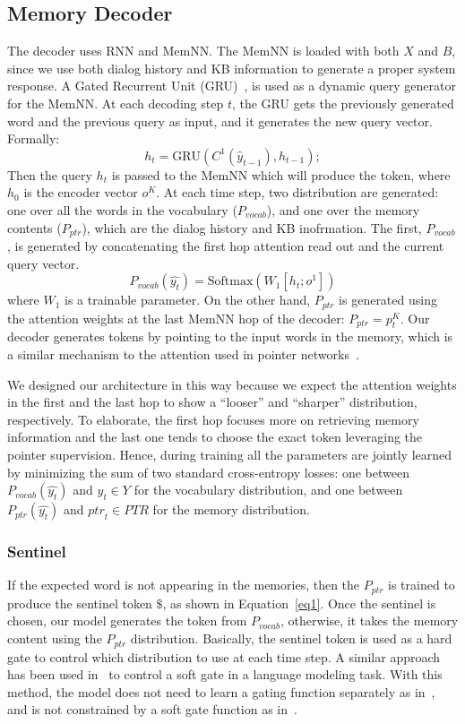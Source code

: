 \documentclass[11pt,a4paper]{article}
\begin{document}
\subsection{Memory Decoder}
The decoder uses RNN and MemNN. The MemNN is loaded with both $X$ and $B$, since we use both dialog history and KB information to generate a proper system response. A Gated Recurrent Unit (GRU)~\cite{GRU}, is used as a dynamic query generator for the MemNN. At each decoding step $t$, the GRU gets the previously generated word and the previous query as input, and it generates the new query vector. Formally:
\begin{equation}
h_t = \text{GRU}(C^1(\hat{y}_{t-1}), h_{t-1});
\label{eq4}
\end{equation}
Then the query $h_t$ is passed to the MemNN which will produce the token, where $h_0$ is the encoder vector $o^K$. At each time step, two distribution are generated: one over all the words in the vocabulary ($P_{vocab}$), and one over the memory contents ($P_{ptr}$), which are the dialog history and KB inofrmation. 
The first, $P_{vocab}$, is generated by concatenating the first hop attention read out and the current query vector. 
\begin{equation}
P_{vocab}(\hat{y_t}) = \text{Softmax}(W_1[h_t;o^1]) 
\label{eq5}
\end{equation}
where $W_1$ is a trainable parameter. On the other hand, $P_{ptr}$ is generated using the attention weights at the last MemNN hop of the decoder: $P_{ptr} = p_t^K$. Our decoder generates tokens by pointing to the input words in the memory, which is a similar mechanism to the attention used in pointer networks~\cite{NIPS2015_5866}.

We designed our architecture in this way because we expect the attention weights in the first and the last hop to show a ``looser'' and ``sharper'' distribution, respectively. To elaborate, the first hop focuses more on retrieving memory information and the last one tends to choose the exact token leveraging the pointer supervision. Hence, during training all the parameters are jointly learned by minimizing the sum of two standard cross-entropy losses: one between $P_{vocab}(\hat{y_t})$ and $y_t\in Y$ for the vocabulary distribution, and one between $P_{ptr}(\hat{y_t})$ and ${ptr}_t\in PTR$ for the memory distribution. 

\subsubsection{Sentinel}
If the expected word is not appearing in the memories, then the $P_{ptr}$ is trained to produce the sentinel token $\$$, as shown in Equation~\ref{eq1}. Once the sentinel is chosen, our model generates the token from $P_{vocab}$, otherwise, it takes the memory content using the $P_{ptr}$ distribution. Basically, the sentinel token is used as a hard gate to control which distribution to use at each time step. A similar approach has been used in~\cite{merity2016pointer} to control a soft gate in a language modeling task. With this method, the model does not need to learn a gating function separately as in~\citet{gulcehre-EtAl:2016:P16-1}, and is not constrained by a soft gate function as in~\citet{see-liu-manning:2017:Long}. 
\end{document}
